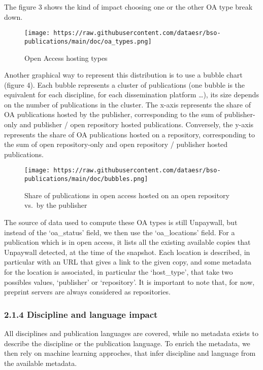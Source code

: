 \documentclass[
]{article}
\begin{document}
The figure 3 shows the kind of impact choosing one or the other OA type
break down.

\begin{figure}
\centering
\texttt{[image: https://raw.githubusercontent.com/dataesr/bso-publications/main/doc/oa\_types.png]}
\caption{Open Access hosting types}
\end{figure}

\newpage

Another graphical way to represent this distribution is to use a bubble
chart (figure 4). Each bubble represents a cluster of publications (one
bubble is the equivalent for each discipline, for each dissemination
platform \ldots), its size depends on the number of publications in the
cluster. The x-axis represents the share of OA publications hosted by
the publisher, corresponding to the sum of publisher-only and publisher
/ open repository hosted publications. Conversely, the y-axis represents
the share of OA publications hosted on a repository, corresponding to
the sum of open repository-only and open repository / publisher hosted
publications.

\begin{figure}
\centering
\texttt{[image: https://raw.githubusercontent.com/dataesr/bso-publications/main/doc/bubbles.png]}
\caption{Share of publications in open access hosted on an open
repository vs.~by the publisher}
\end{figure}

The source of data used to compute these OA types is still Unpaywall,
but instead of the `oa\_status' field, we then use the `oa\_locations'
field. For a publication which is in open access, it lists all the
existing available copies that Unpaywall detected, at the time of the
snapshot. Each location is described, in particular with an URL that
gives a link to the given copy, and some metadata for the location is
associated, in particular the `host\_type', that take two possibles
values, `publisher' or `repository'. It is important to note that, for
now, preprint servers are always considered as repositories.

\hypertarget{discipline-and-language-impact}{%
\subsubsection{2.1.4 Discipline and language
impact}\label{discipline-and-language-impact}}

All disciplines and publication languages are covered, while no metadata
exists to describe the discipline or the publication language. To enrich
the metadata, we then rely on machine learning approches, that infer
discipline and language from the available metadata.
\end{document}

